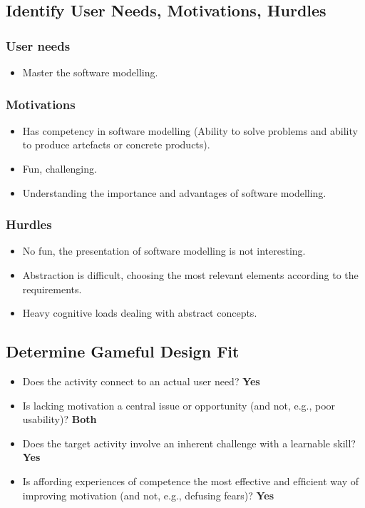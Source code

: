 \documentclass[12pt, a4paper]{report}
\begin{document}
{\begin{appendices}
\subsection{Identify User Needs, Motivations, Hurdles}
\subsubsection{User needs}
\begin{itemize}
\item Master the software modelling.
\end{itemize}
\subsubsection{Motivations}
\begin{itemize}
\item Has competency in software modelling (Ability to solve problems and ability to produce artefacts or concrete products).
\item Fun, challenging.
\item Understanding the importance and advantages of software modelling.
\end{itemize}
\subsubsection{Hurdles}
\begin{itemize}
\item No fun, the presentation of software modelling is not interesting.
\item Abstraction is difficult, choosing the most relevant elements according to the requirements.
\item Heavy cognitive loads dealing with abstract concepts.
\end{itemize}

\subsection{Determine Gameful Design Fit}
\begin{itemize}
\item Does the activity connect to an actual user need? \textbf{Yes}
\item Is lacking motivation a central issue or opportunity (and not, e.g., poor usability)? \textbf{Both}
\item Does the target activity involve an inherent challenge with a learnable skill? \textbf{Yes}
\item Is affording experiences of competence the most effective and efﬁcient way of improving motivation (and not, e.g., defusing fears)? \textbf{Yes}
\end{itemize}


\end{appendices}}
\end{document}
